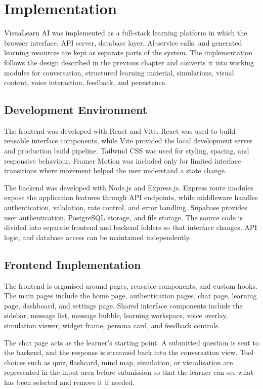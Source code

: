 \chapter{Implementation}

VisuaLearn AI was implemented as a full-stack learning platform in which the browser interface, API server, database layer, AI-service calls, and generated learning resources are kept as separate parts of the system. The implementation follows the design described in the previous chapter and converts it into working modules for conversation, structured learning material, simulations, visual content, voice interaction, feedback, and persistence.

\section[Development Environment]{\textbf{Development Environment}}
The frontend was developed with React and Vite. React was used to build reusable interface components, while Vite provided the local development server and production build pipeline. Tailwind CSS was used for styling, spacing, and responsive behaviour. Framer Motion was included only for limited interface transitions where movement helped the user understand a state change.

The backend was developed with Node.js and Express.js. Express route modules expose the application features through API endpoints, while middleware handles authentication, validation, rate control, and error handling. Supabase provides user authentication, PostgreSQL storage, and file storage. The source code is divided into separate frontend and backend folders so that interface changes, API logic, and database access can be maintained independently.

\section[Frontend Implementation]{\textbf{Frontend Implementation}}
The frontend is organised around pages, reusable components, and custom hooks. The main pages include the home page, authentication pages, chat page, learning page, dashboard, and settings page. Shared interface components include the sidebar, message list, message bubble, learning workspace, voice overlay, simulation viewer, widget frame, persona card, and feedback controls.

The chat page acts as the learner's starting point. A submitted question is sent to the backend, and the response is streamed back into the conversation view. Tool choices such as quiz, flashcard, mind map, simulation, or visualisation are represented in the input area before submission so that the learner can see what has been selected and remove it if needed.

